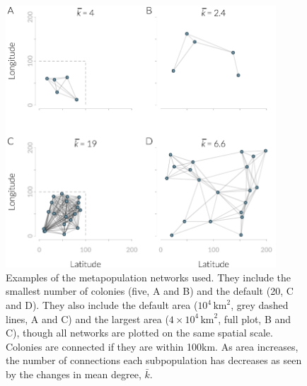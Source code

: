 \begin{knitrout}\footnotesize
{}\color{fgcolor}\begin{figure}[t]

{\centering \includegraphics[width=0.9\textwidth]{figure/colonyNetworkPlots-1} 

}

\caption[Example metapopulation networks]{
Examples of the metapopulation networks used.
They include the smallest number of colonies (five, A and B) and the default (20, C and D).
They also include the default area ($10^4\,\text{km}^2$, grey dashed lines, A and C) and the largest area ($4\times10^4\,\text{km}^2$, full plot, B and C), though all networks are plotted on the same spatial scale.
Colonies are connected if they are within 100km.
As area increases, the number of connections each subpopulation has decreases as seen by the changes in mean degree, $\bar{k}$.
}\label{fig:colonyNetworkPlots}
\end{figure}


\end{knitrout}











